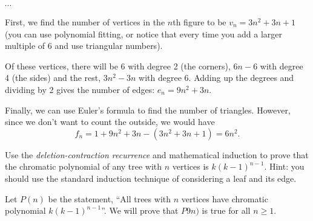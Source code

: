 \documentclass[10pt]{exam}
\def\vertexsize{4 pt}
\newcommand{\vtx}[2]{node[fill,circle,inner sep=0 pt, minimum size=\vertexsize,label=#1:#2]{}}
\renewcommand{\v}{\vtx{above}{}}
\begin{document}
\begin{questions}
\hfill
{}
\hfill
{}
\hfill
$\cdots$

\begin{solution}
  First, we find the number of vertices in the $n$th figure to be $v_n = 3n^2 +3n + 1$ (you can use polynomial fitting, or notice that every time you add a larger multiple of 6 and use triangular numbers).

  Of these vertices, there will be 6 with degree 2 (the corners), $6n-6$ with degree 4 (the sides) and the rest, $3n^2 - 3n$ with degree 6.  Adding up the degrees and dividing by 2 gives the number of edges: $e_n = 9n^2 + 3n$.

  Finally, we can use Euler's formula to find the number of triangles.  However, since we don't want to count the outside, we would have
  \[f_n = 1 + 9n^2 + 3n - (3n^2 + 3n + 1) = 6n^2.\]
\end{solution}




\question[4] Use the \emph{deletion-contraction recurrence} and mathematical induction to prove that the chromatic polynomial of any tree with $n$ vertices is $k(k-1)^{n-1}$.  Hint: you should use the standard induction technique of considering a leaf and its edge.  

\begin{solution}
  Let $P(n)$ be the statement, ``All trees with $n$ vertices have chromatic polynomial $k(k-1)^{n-1}$''.  We will prove that $P9n)$ is true for all $n \ge 1$.
  

\end{solution}
\end{questions}
\end{document}
